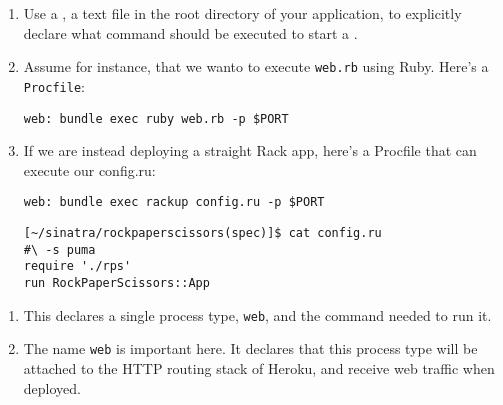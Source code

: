 \begin{enumerate}
\item 
Use a , a text file in the root directory of your
application, to explicitly declare what command should be executed
to start a . 

\item 
Assume for instance, that we wanto to execute 
\verb|web.rb| using Ruby.
Here’s a \verb|Procfile|:
\begin{verbatim}
web: bundle exec ruby web.rb -p $PORT
\end{verbatim}
\item 
If we are instead deploying a straight Rack app, here’s a Procfile
that can execute our config.ru:
\begin{verbatim}
web: bundle exec rackup config.ru -p $PORT
\end{verbatim}

\begin{verbatim}
[~/sinatra/rockpaperscissors(spec)]$ cat config.ru 
#\ -s puma
require './rps'
run RockPaperScissors::App
\end{verbatim}
\end{enumerate}

\begin{enumerate}
\item 
This declares a single process type, \verb|web|, and the command needed
to run it. 
\item 
The name \verb|web| is important here. 
It declares that this
process type will be attached to the HTTP routing stack of Heroku,
and receive web traffic when deployed.
\end{enumerate}

